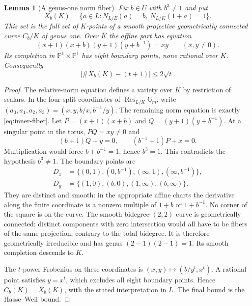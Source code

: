 \documentclass[11pt]{article}
\newtheorem{lemma}[theorem]{Lemma}
\begin{document}
\begin{lemma}[A genus-one norm fiber]\label{lem:inner-fiber}
Fix $b\in U$ with $b^3\ne1$ and put
\[
 X_b(K)=\{a\in L:N_{L/E}(a)=b,\ N_{L/K}(1+a)=1\}.
\]
This set is the full set of $K$-points of a smooth projective
geometrically connected curve $C_b/K$ of genus one. Over $\overline K$
the affine part has equation
\begin{equation}\label{eq:inner-fiber}
 (x+1)(x+b)(y+1)(y+b^{-1})=xy
 \qquad (x,y\ne0).
\end{equation}
Its completion in $\mathbb P^1\times\mathbb P^1$ has eight boundary
points, none rational over $K$. Consequently
\[
 \bigl|\#X_b(K)-(t+1)\bigr|\le2\sqrt t.
\]
\end{lemma}
\begin{proof}
The relative-norm equation defines a variety over $K$ by restriction
of scalars. In the four split coordinates of $\operatorname{Res}_{L/K}
\mathbb G_m$, write
$(a_0,a_1,a_2,a_3)=(x,y,b/x,b^{-1}/y)$.
The remaining norm equation is exactly \eqref{eq:inner-fiber}.
Let $P=(x+1)(x+b)$ and $Q=(y+1)(y+b^{-1})$.
At a singular point in the torus, $PQ=xy\ne0$ and
\[
 (b+1)Q+y=0,\qquad (b^{-1}+1)P+x=0.
\]
Multiplication would force $b+b^{-1}=1$, hence $b^3=1$.
This contradicts the hypothesis $b^3\ne1$.
The boundary points are
\[
\begin{split}
 D_x&=\{(0,1),(0,b^{-1}),(\infty,1),(\infty,b^{-1})\},\\
 D_y&=\{(1,0),(b,0),(1,\infty),(b,\infty)\}.
\end{split}
\]
They are distinct and smooth: in the appropriate affine charts the
derivative along the finite coordinate is a nonzero multiple of
$1+b$ or $1+b^{-1}$. No corner of the square is on the curve.
The smooth bidegree-$(2,2)$ curve is geometrically connected:
distinct components with zero intersection would all have to be
fibers of the same projection, contrary to the total bidegree.
It is therefore geometrically irreducible and has genus
$(2-1)(2-1)=1$. Its smooth completion descends to $K$.

The $t$-power Frobenius on these coordinates is
$(x,y)\mapsto(b/y^t,x^t)$. A rational point satisfies $y=x^t$,
which excludes all eight boundary points. Hence
$C_b(K)=X_b(K)$, with the stated interpretation in $L$.
The final bound is the Hasse--Weil bound.
\end{proof}
\end{document}
